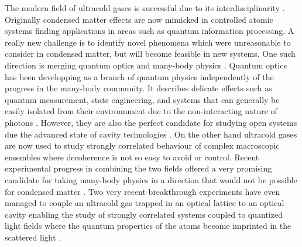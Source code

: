 The modern field of ultracold gases is successful due to its
interdisciplinarity \cite{lewenstein2007, bloch2008}. Originally
condensed matter effects are now mimicked in controlled atomic systems
finding applications in areas such as quantum information
processing. A really new challenge is to identify novel phenomena
which were unreasonable to consider in condensed matter, but will
become feasible in new systems. One such direction is merging quantum
optics and many-body physics \cite{mekhov2012, ritsch2013}. Quantum
optics has been developping as a branch of quantum physics
independently of the progress in the many-body community. It describes
delicate effects such as quantum measurement, state engineering, and
systems that can generally be easily isolated from their environnment
due to the non-interacting nature of photons \cite{Scully}. However,
they are also the perfect candidate for studying open systems due the
advanced state of cavity technologies \cite{carmichael,
  MeasurementControl}. On the other hand ultracold gases are now used
to study strongly correlated behaviour of complex macroscopic
ensembles where decoherence is not so easy to avoid or control. Recent
experimental progress in combining the two fields offered a very
promising candidate for taking many-body physics in a direction that
would not be possible for condensed matter \cite{baumann2010,
  wolke2012, schmidt2014}. Two very recent breakthrough experiments
have even managed to couple an ultracold gas trapped in an optical
lattice to an optical cavity enabling the study of strongly correlated
systems coupled to quantized light fields where the quantum properties
of the atoms become imprinted in the scattered light
\cite{klinder2015, landig2016}.

